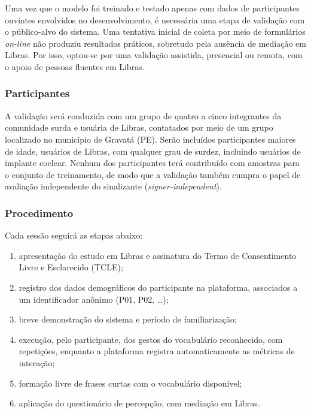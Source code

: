 Uma vez que o modelo foi treinado e testado apenas com dados de participantes
ouvintes envolvidos no desenvolvimento, é necessária uma etapa de validação com o
público-alvo do sistema. Uma tentativa inicial de coleta por meio de formulários
\textit{on-line} não produziu resultados práticos, sobretudo pela ausência de
mediação em Libras. Por isso, optou-se por uma validação assistida, presencial ou
remota, com o apoio de pessoas fluentes em Libras.

\subsubsection{Participantes}

A validação será conduzida com um grupo de quatro a cinco integrantes da
comunidade surda e usuária de Libras, contatados por meio de um grupo localizado
no município de Gravatá (PE). Serão incluídos participantes maiores de idade,
usuários de Libras, com qualquer grau de surdez, incluindo usuários de implante
coclear. Nenhum dos participantes terá contribuído com amostras para o conjunto
de treinamento, de modo que a validação também cumpra o papel de avaliação
independente do sinalizante (\textit{signer-independent}).

\subsubsection{Procedimento}

Cada sessão seguirá as etapas abaixo:

\begin{enumerate}[leftmargin=2cm]
  \item apresentação do estudo em Libras e assinatura do Termo de Consentimento
  Livre e Esclarecido (TCLE);
  \item registro dos dados demográficos do participante na plataforma, associados
  a um identificador anônimo (P01, P02, \dots);
  \item breve demonstração do sistema e período de familiarização;
  \item execução, pelo participante, dos gestos do vocabulário reconhecido, com
  repetições, enquanto a plataforma registra automaticamente as métricas de
  interação;
  \item formação livre de frases curtas com o vocabulário disponível;
  \item aplicação do questionário de percepção, com mediação em Libras.
\end{enumerate}

